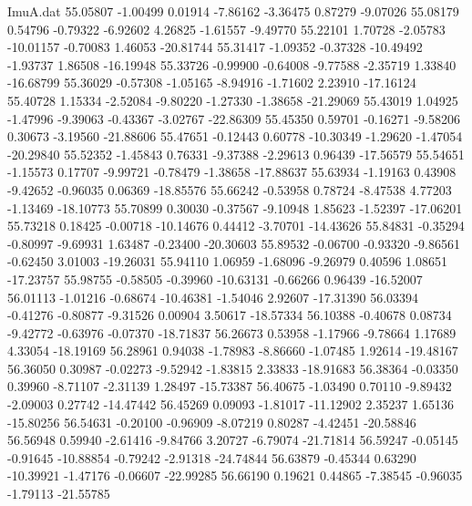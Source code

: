 \begin{filecontents}{ImuA.dat}
  55.05807   -1.00499    0.01914   -7.86162   -3.36475    0.87279   -9.07026
  55.08179    0.54796   -0.79322   -6.92602    4.26825   -1.61557   -9.49770
  55.22101    1.70728   -2.05783  -10.01157   -0.70083    1.46053  -20.81744
  55.31417   -1.09352   -0.37328  -10.49492   -1.93737    1.86508  -16.19948
  55.33726   -0.99900   -0.64008   -9.77588   -2.35719    1.33840  -16.68799
  55.36029   -0.57308   -1.05165   -8.94916   -1.71602    2.23910  -17.16124
  55.40728    1.15334   -2.52084   -9.80220   -1.27330   -1.38658  -21.29069
  55.43019    1.04925   -1.47996   -9.39063   -0.43367   -3.02767  -22.86309
  55.45350    0.59701   -0.16271   -9.58206    0.30673   -3.19560  -21.88606
  55.47651   -0.12443    0.60778  -10.30349   -1.29620   -1.47054  -20.29840
  55.52352   -1.45843    0.76331   -9.37388   -2.29613    0.96439  -17.56579
  55.54651   -1.15573    0.17707   -9.99721   -0.78479   -1.38658  -17.88637
  55.63934   -1.19163    0.43908   -9.42652   -0.96035    0.06369  -18.85576
  55.66242   -0.53958    0.78724   -8.47538    4.77203   -1.13469  -18.10773
  55.70899    0.30030   -0.37567   -9.10948    1.85623   -1.52397  -17.06201
  55.73218    0.18425   -0.00718  -10.14676    0.44412   -3.70701  -14.43626
  55.84831   -0.35294   -0.80997   -9.69931    1.63487   -0.23400  -20.30603
  55.89532   -0.06700   -0.93320   -9.86561   -0.62450    3.01003  -19.26031
  55.94110    1.06959   -1.68096   -9.26979    0.40596    1.08651  -17.23757
  55.98755   -0.58505   -0.39960  -10.63131   -0.66266    0.96439  -16.52007
  56.01113   -1.01216   -0.68674  -10.46381   -1.54046    2.92607  -17.31390
  56.03394   -0.41276   -0.80877   -9.31526    0.00904    3.50617  -18.57334
  56.10388   -0.40678    0.08734   -9.42772   -0.63976   -0.07370  -18.71837
  56.26673    0.53958   -1.17966   -9.78664    1.17689    4.33054  -18.19169
  56.28961    0.94038   -1.78983   -8.86660   -1.07485    1.92614  -19.48167
  56.36050    0.30987   -0.02273   -9.52942   -1.83815    2.33833  -18.91683
  56.38364   -0.03350    0.39960   -8.71107   -2.31139    1.28497  -15.73387
  56.40675   -1.03490    0.70110   -9.89432   -2.09003    0.27742  -14.47442
  56.45269    0.09093   -1.81017  -11.12902    2.35237    1.65136  -15.80256
  56.54631   -0.20100   -0.96909   -8.07219    0.80287   -4.42451  -20.58846
  56.56948    0.59940   -2.61416   -9.84766    3.20727   -6.79074  -21.71814
  56.59247   -0.05145   -0.91645  -10.88854   -0.79242   -2.91318  -24.74844
  56.63879   -0.45344    0.63290  -10.39921   -1.47176   -0.06607  -22.99285
  56.66190    0.19621    0.44865   -7.38545   -0.96035   -1.79113  -21.55785

\end{filecontents}
